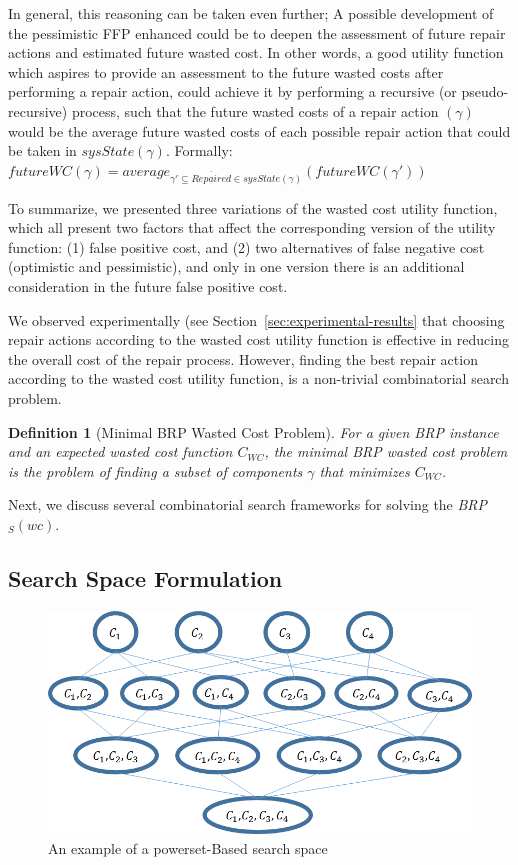 \documentclass[review]{elsarticle}
\newtheorem{definition}{Definition}
\newcommand{\brpswc}{\textit{BRP$_S(wc)$}}
\begin{document}
In general, this reasoning can be taken even further; A possible development of the pessimistic FFP enhanced could be to deepen the assessment of future repair actions and estimated future wasted cost. In other words, a good utility function which aspires to provide an assessment to the future wasted costs after performing a repair action, could achieve it by performing a recursive (or pseudo-recursive) process, such that the future wasted costs of a repair action $(\gamma)$ would be the average future wasted costs of each possible repair action that could be taken in $sysState(\gamma)$. Formally:
$futureWC(\gamma) = average_{\gamma{}'\subseteq \overline{Repaired} \in sysState(\gamma)}(futureWC(\gamma{}'))$

To summarize, we presented three variations of the wasted cost utility function, which all present two factors that affect the corresponding version of the utility function: (1) false positive cost, and (2) two alternatives of false negative cost (optimistic and pessimistic), and only in one version there is an additional consideration in the future false positive cost.


We observed experimentally (see Section~\ref{sec:experimental-results} that choosing repair actions according to the wasted cost utility function is effective in reducing the overall cost of the repair process. However, finding the best repair action according to the wasted cost utility function, is a non-trivial combinatorial search problem. 
\begin{definition}[Minimal BRP Wasted Cost Problem]
For a given BRP instance and an expected wasted cost function $C_{WC}$, 
the minimal BRP wasted cost problem is the problem of 
finding a subset of components $\gamma$ that minimizes $C_{WC}$. 
\end{definition}
Next, we discuss several combinatorial search frameworks for solving the \brpswc{}.


\subsection{Search Space Formulation}

\begin{figure}
\centering
\includegraphics[width=0.75\columnwidth]{PowersetBasedSearch.png}
\caption{An example of a powerset-Based search space }
\label{fig:power-search-space}
\end{figure}
\end{document}
